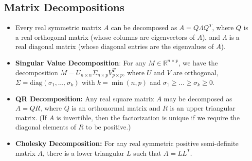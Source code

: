 \documentclass[twoside]{article}
\newcommand\bbR{\mathbb{R}}
\newcommand\Lmb{\Lambda}
\newcommand\sg{\sigma}
\newcommand\Sg{\Sigma}
\begin{document}
\subsection{Matrix Decompositions}
\begin{itemize}
\item Every real symmetric matrix $A$ can be decomposed as $A = Q \Lmb Q^T$, where $Q$ is a real orthogonal matrix (whose columns are eigenvectors of $A$), and $\Lmb$ is a real diagonal matrix (whose diagonal entries are the eigenvalues of $A$).

\item \textbf{Singular Value Decomposition}: For any $M \in \bbR^{n \times p}$, we have the decomposition $M = U_{n \times n} \Sg_{n \times p} V_{p \times p}^T$, where $U$ and $V$ are orthogonal, $\Sg = \text{diag}(\sg_1, \dots, \sg_k)$ with $k = \min (n, p)$ and $\sg_1 \geq \dots \geq \sg_k \geq 0$.

\item \textbf{QR Decomposition:} Any real square matrix $A$ may be decomposed as $A = QR$, where $Q$ is an orthonormal matrix and $R$ is an upper triangular matrix. (If $A$ is invertible, then the factorization is unique if we require the diagonal elements of $R$ to be positive.)

\item \textbf{Cholesky Decomposition:} For any real symmetric positive semi-definite matrix $A$, there is a lower triangular $L$ such that $A = LL^T$.
\end{itemize}
\end{document}
